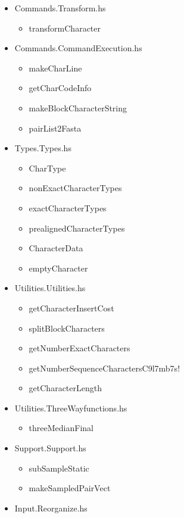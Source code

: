 \documentclass[11pt]{article}
\begin{document}
\begin{itemize}
			 \item{Commands.Transform.hs}
				\begin{itemize}
				\item{transformCharacter}
			\end{itemize}
			 \item{Commands.CommandExecution.hs}
				\begin{itemize}
				\item{makeCharLine}
				\item{getCharCodeInfo}
				\item{makeBlockCharacterString}
				\item{pairList2Fasta}
				\end{itemize}
			 \item{Types.Types.hs}
				 \begin{itemize}
				 	\item{CharType}
				 	\item{nonExactCharacterTypes}
				 	\item{exactCharacterTypes}
				 	\item{prealignedCharacterTypes}
				 	\item{CharacterData}
				 	\item{emptyCharacter}
				 \end{itemize}
			 \item{Utilities.Utilities.hs}
				\begin{itemize}
					\item{getCharacterInsertCost}
					\item{splitBlockCharacters}
					\item{getNumberExactCharacters}
					\item{getNumberSequenceCharactersC9l7mb7s!
					}
					\item{getCharacterLength}
				\end{itemize}
			 \item{Utilities.ThreeWayfunctions.hs}
				\begin{itemize}
					\item{threeMedianFinal}
				\end{itemize}
			 \item{Support.Support.hs}
				\begin{itemize}
					\item{subSampleStatic}
					\item{makeSampledPairVect}
				\end{itemize}
			 \item{Input.Reorganize.hs}
			 \begin{itemize}

\end{itemize}
\end{itemize}
\end{document}
